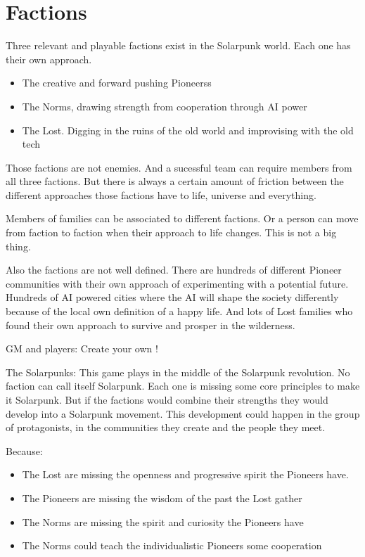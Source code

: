 \chapter{Factions}

Three relevant and playable factions exist in the Solarpunk world. Each one has their own approach. 

\begin{itemize}
    \item The creative and forward pushing Pioneerss
    \item The Norms, drawing strength from cooperation through AI power
    \item The Lost. Digging in the ruins of the old world and improvising with the old tech
\end{itemize}

Those factions are not enemies. And a sucessful team can require members from all three factions. But there is always a certain amount of friction between the different approaches those factions have to life, universe and everything.

Members of families can be associated to different factions. Or a person can move from faction to faction when their approach to life changes. This is not a big thing.

Also the factions are not well defined. There are hundreds of different Pioneer communities with their own approach of experimenting with a potential future. Hundreds of AI powered cities where the AI will shape the society differently because of the local own definition of a happy life. And lots of Lost families who found their own approach to survive and prosper in the wilderness.

GM and players: Create your own !

The Solarpunks: This game plays in the middle of the Solarpunk revolution. No faction can call itself Solarpunk. Each one is missing some core principles to make it Solarpunk. But if the factions would combine their strengths they would develop into a Solarpunk movement. This development could happen in the group of protagonists, in the communities they create and the people they meet.

Because:
\begin{itemize}
\item The Lost are missing the openness and progressive spirit the Pioneers have.
\item The Pioneers are missing the wisdom of the past the Lost gather
\item The Norms are missing the spirit and curiosity the Pioneers have
\item The Norms could teach the individualistic Pioneers some cooperation
\end{itemize}
